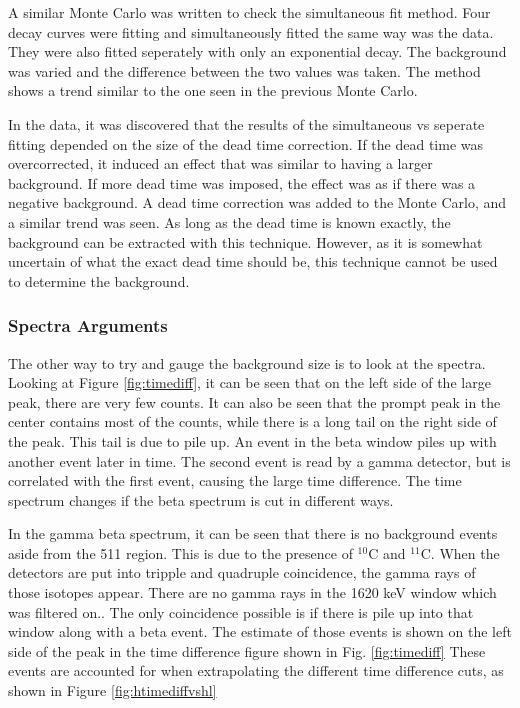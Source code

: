 A similar Monte Carlo was written to check the simultaneous fit method.
Four decay curves were fitting and simultaneously fitted the same way was the data.
They were also fitted seperately with only an exponential decay.
The background was varied and the difference between the two values was taken.
The method shows a trend similar to the one seen in the previous Monte Carlo.

In the data, it was discovered that the results of the simultaneous vs seperate fitting depended on the size of the dead time correction.
If the dead time was overcorrected, it induced an effect that was similar to having a larger background.
If more dead time was imposed, the effect was as if there was a negative background.
A dead time correction was added to the Monte Carlo, and a similar trend was seen.
As long as the dead time is known exactly, the background can be extracted with this technique. 
However, as it is somewhat uncertain of what the exact dead time should be, this technique cannot be used to determine the background.

\subsubsection{Spectra Arguments}
The other way to try and gauge the background size is to look at the spectra.
Looking at Figure \ref{fig:timediff}, it can be seen that on the left side of the large peak, there are very few counts.
It can also be seen that the prompt peak in the center contains most of the counts, while there is a long tail on the right side of the peak.
This tail is due to pile up. 
An event in the beta window piles up with another event later in time. 
The second event is read by a gamma detector, but is correlated with the first event, causing the large time difference.
The time spectrum changes if the beta spectrum is cut in different ways.

In the gamma beta spectrum, it can be seen that there is no background events aside from the 511 region.
This is due to the presence of $^{10}$C and $^{11}$C.
When the detectors are put into tripple and quadruple coincidence, the gamma rays of those isotopes appear.
There are no gamma rays in the 1620 keV window which was filtered on..
The only coincidence possible is if there is pile up into that window along with a beta event.
The estimate of those events is shown on the left side of the peak in the time difference figure shown in Fig. \ref{fig:timediff}  
These events are accounted for when extrapolating the different time difference cuts, as shown in Figure \ref{fig:htimediffvshl}

